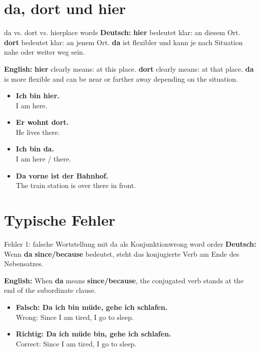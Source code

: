 \documentclass[a4paper,11pt]{article}
\newcommand{\GermanText}[1]{\textbf{Deutsch: }#1\par}
\newcommand{\EnglishText}[1]{{\small\color{SoftGray}\textbf{English: }#1\par}}
\newcommand{\ExampleItem}[2]{\item \textbf{#1}\\{\small\color{SoftGray}#2}}
\begin{document}
\section{da, dort und hier}

\begin{grammarentry}{da vs. dort vs. hier}{place words}
\GermanText{\textbf{hier} bedeutet klar: an diesem Ort. \textbf{dort} bedeutet klar: an jenem Ort. \textbf{da} ist flexibler und kann je nach Situation nahe oder weiter weg sein.}
\EnglishText{\textbf{hier} clearly means: at this place. \textbf{dort} clearly means: at that place. \textbf{da} is more flexible and can be near or farther away depending on the situation.}

\begin{exbox}
\begin{itemize}
    \ExampleItem{Ich bin hier.}{I am here.}
    \ExampleItem{Er wohnt dort.}{He lives there.}
    \ExampleItem{Ich bin da.}{I am here / there.}
    \ExampleItem{Da vorne ist der Bahnhof.}{The train station is over there in front.}
\end{itemize}
\end{exbox}
\end{grammarentry}

\section{Typische Fehler}

\begin{grammarentry}{Fehler 1: falsche Wortstellung mit da als Konjunktion}{wrong word order}
\GermanText{Wenn \textbf{da} \textbf{since/because} bedeutet, steht das konjugierte Verb am Ende des Nebensatzes.}
\EnglishText{When \textbf{da} means \textbf{since/because}, the conjugated verb stands at the end of the subordinate clause.}

\begin{exbox}
\begin{itemize}
    \ExampleItem{Falsch: Da ich bin müde, gehe ich schlafen.}{Wrong: Since I am tired, I go to sleep.}
    \ExampleItem{Richtig: Da ich müde bin, gehe ich schlafen.}{Correct: Since I am tired, I go to sleep.}
\end{itemize}
\end{exbox}
\end{grammarentry}
\end{document}
